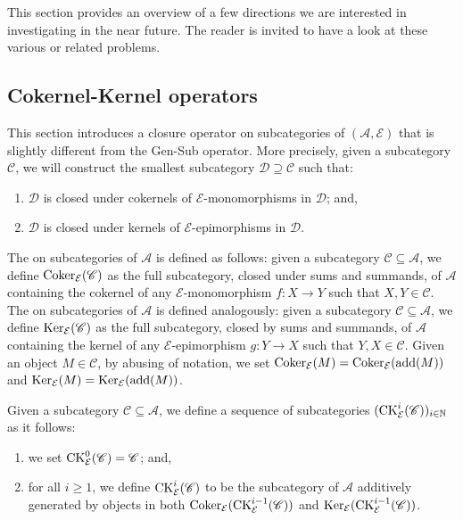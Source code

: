 \pagestyle{plain}

This section provides an overview of a few directions we are interested in investigating in the near future. The reader is invited to have a look at these various or related problems.

\subsection{Cokernel-Kernel operators}

This section introduces a closure operator on subcategories of $(\mathscr{A},\mathcal{E})$ that is slightly different from the Gen-Sub operator. More precisely, given a subcategory $\mathscr{C}$, we will construct the smallest subcategory $\mathscr{D} \supseteq \mathscr{C}$ such that:
\begin{enumerate}[label=$\bullet$,itemsep=1mm]
    \item $\mathscr{D}$ is closed under cokernels of $\mathcal{E}$-monomorphisms in $\mathscr{D}$; and,
    \item  $\mathscr{D}$ is closed under kernels of $\mathcal{E}$-epimorphisms in $\mathscr{D}$.
\end{enumerate}

The  on subcategories of $\mathscr{A}$ is defined as follows: given a subcategory $\mathscr{C} \subseteq \mathscr{A}$, we define $\operatorname{Coker}_\mathcal{E}(\mathscr{C})$ as the full subcategory, closed under sums and summands, of $\mathscr{A}$ containing the cokernel of any $\mathcal{E}$-monomorphism $f : X \longrightarrow Y$ such that $X,Y \in \mathscr{C}$. The  on subcategories of $\mathscr{A}$ is defined analogously: given a subcategory $\mathscr{C} \subseteq \mathscr{A}$, we define $\operatorname{Ker}_\mathcal{E}(\mathscr{C})$ as the full subcategory, closed by sums and summands, of $\mathscr{A}$ containing the kernel of any $\mathcal{E}$-epimorphism $g : Y \longrightarrow X$  such that $Y,X \in \mathscr{C}$. Given an object $M \in \mathscr{C}$, by abusing of notation, we set $\operatorname{Coker}_\mathcal{E}(M) = \operatorname{Coker}_\mathcal{E}(\operatorname{add}(M))$ and $\operatorname{Ker}_\mathcal{E}(M) = \operatorname{Ker}_\mathcal{E}(\operatorname{add}(M))$.

Given a subcategory $\mathscr{C} \subseteq \mathscr{A}$, we define a sequence of subcategories $(\mathrm{CK}_{\mathcal{E}}^i(\mathscr{C}))_{i\in \mathbb{N}}$ as it follows:
\begin{enumerate}[label=$\bullet$, itemsep=1mm]
    \item we set $\mathrm{CK}_{\mathcal{E}}^0(\mathscr{C}) = \mathscr{C}$; and,
    \item for all $i \geqslant 1$, we define $\mathrm{CK}^{i}_{\mathcal{E}}(\mathscr{C})$ to be the subcategory of $\mathscr{A}$ additively generated by objects in both $\operatorname{Coker}_{\mathcal{E}}(\mathrm{CK}^{i-1}_{\mathcal{E}}(\mathscr{C}))$ and $\operatorname{Ker}_{\mathcal{E}}(\mathrm{CK}^{i-1}_{\mathcal{E}}(\mathscr{C}))$.
\end{enumerate}


